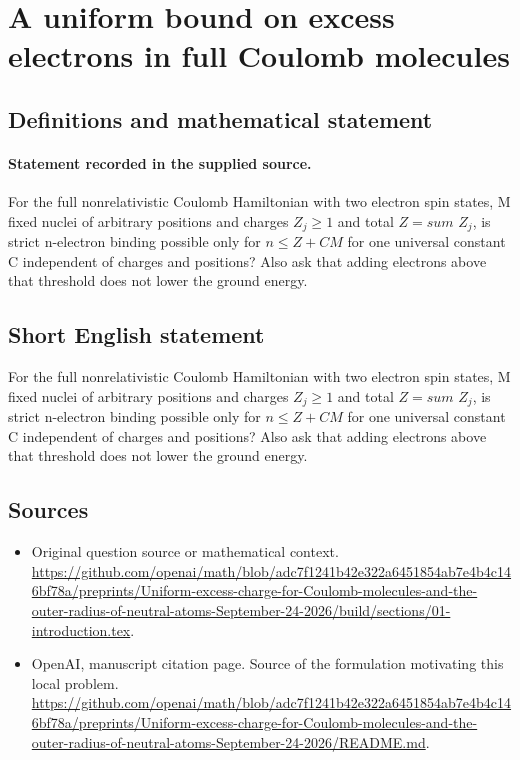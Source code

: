 \documentclass[11pt]{article}
\begin{document}
\section*{A uniform bound on excess electrons in full Coulomb molecules}\label{statement}
\subsection{Definitions and mathematical statement}
\paragraph{Statement recorded in the supplied source.}
For the full nonrelativistic Coulomb Hamiltonian with two electron spin states, M fixed nuclei of arbitrary positions and charges $Z_j\geq 1$ and total $Z=sum$ $Z_j$, is strict n-electron binding possible only for $n\leq Z+CM$ for one universal constant C independent of charges and positions? Also ask that adding electrons above that threshold does not lower the ground energy.
\subsection{Short English statement}
For the full nonrelativistic Coulomb Hamiltonian with two electron spin states, M fixed nuclei of arbitrary positions and charges $Z_j\geq 1$ and total $Z=sum$ $Z_j$, is strict n-electron binding possible only for $n\leq Z+CM$ for one universal constant C independent of charges and positions? Also ask that adding electrons above that threshold does not lower the ground energy.
\subsection{Sources}
\begin{itemize}
\item[S1] Original question source or mathematical context.
\url{https://github.com/openai/math/blob/adc7f1241b42e322a6451854ab7e4b4c146bf78a/preprints/Uniform-excess-charge-for-Coulomb-molecules-and-the-outer-radius-of-neutral-atoms-September-24-2026/build/sections/01-introduction.tex}.
\item[S2] OpenAI, manuscript citation page. Source of the formulation motivating this local problem.
\url{https://github.com/openai/math/blob/adc7f1241b42e322a6451854ab7e4b4c146bf78a/preprints/Uniform-excess-charge-for-Coulomb-molecules-and-the-outer-radius-of-neutral-atoms-September-24-2026/README.md}.
\end{itemize}
\end{document}
